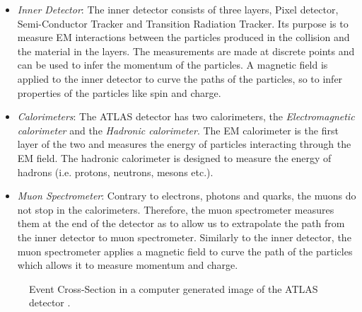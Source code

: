 \begin{itemize}
    \item \emph{Inner Detector}: The inner detector consists of three layers, Pixel detector, Semi-Conductor Tracker 
          and Transition Radiation Tracker. Its purpose is to measure \ac{EM} interactions between the particles 
          produced in the collision and the material in the layers. The measurements are made at discrete points and can be 
          used to infer the momentum of the particles. A magnetic field is applied to the inner detector
          to curve the paths of the particles, so to infer properties of the particles like spin and charge.  
    \item \emph{Calorimeters}: The \ac{ATLAS} detector has two calorimeters, the \emph{Electromagnetic calorimeter} and the 
           \emph{Hadronic calorimeter}. The \ac{EM} calorimeter is the first layer of the two and measures the energy of 
           particles interacting through the \ac{EM} field. The hadronic calorimeter is designed to measure the energy of 
           hadrons (i.e. protons, neutrons, mesons etc.).
    \item \emph{Muon Spectrometer}: Contrary to electrons, photons and quarks, the muons do not stop in the calorimeters.
            Therefore, the muon spectrometer measures them at the end of the detector as to allow us to extrapolate
            the path from the inner detector to muon spectrometer. Similarly to the inner detector, the muon spectrometer 
            applies a magnetic field to curve the path of the particles which allows it to measure momentum and charge. 
\end{itemize}
\begin{figure}
    \centering
    \caption[Event Cross Section in a computer generated image of the
    \acs{ATLAS} detector.]{Event Cross-Section in a computer generated image of the
    ATLAS detector \cite{PDetector}.}
    \label{fig:detector}
\end{figure}

